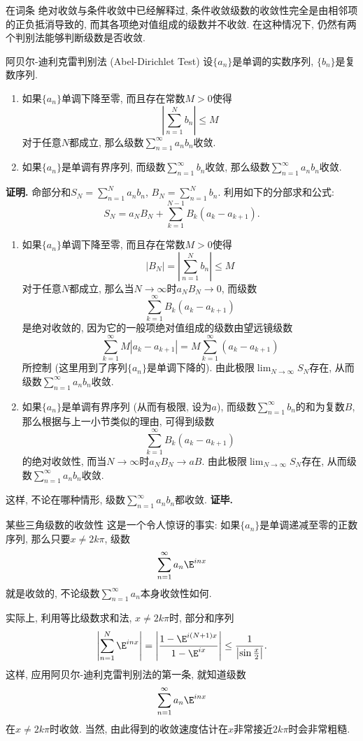 

在词条 绝对收敛与条件收敛中已经解释过, 条件收敛级数的收敛性完全是由相邻项的正负抵消导致的, 而其各项绝对值组成的级数并不收敛. 在这种情况下, 仍然有两个判别法能够判断级数是否收敛.

\begin{theorem}{阿贝尔-迪利克雷判别法 (Abel-Dirichlet Test)}
设$\{a_n\}$是单调的实数序列, $\{b_n\}$是复数序列.

\begin{enumerate}
\item 如果$\{a_n\}$单调下降至零, 而且存在常数$M>0$使得
$$
\left|\sum_{n=1}^N b_n\right|\leq M
$$
对于任意$N$都成立, 那么级数$\sum_{n=1}^\infty a_nb_n$收敛.

\item 如果$\{a_n\}$是单调有界序列, 而级数$\sum_{n=1}^\infty b_n$收敛, 那么级数$\sum_{n=1}^\infty a_nb_n$收敛.
\end{enumerate}
\end{theorem}

\textbf{证明.} 命部分和$S_N=\sum_{n=1}^N a_nb_n$, $B_N=\sum_{n=1}^N b_n$. 利用如下的分部求和公式:
$$
S_N=a_NB_N+\sum_{k=1}^{N-1}B_k(a_{k}-a_{k+1}).
$$

\begin{enumerate}
\item 如果$\{a_n\}$单调下降至零, 而且存在常数$M>0$使得
$$
|B_N|=\left|\sum_{n=1}^N b_n\right|\leq M
$$
对于任意$N$都成立, 那么当$N\to\infty$时$a_NB_N\to0$, 而级数
$$
\sum_{k=1}^{\infty}B_k(a_{k}-a_{k+1})
$$
是绝对收敛的, 因为它的一般项绝对值组成的级数由望远镜级数
$$
\sum_{k=1}^{\infty}M|a_{k}-a_{k+1}|
=M\sum_{k=1}^{\infty}(a_{k}-a_{k+1})
$$
所控制 (这里用到了序列$\{a_n\}$是单调下降的). 由此极限$\lim_{N\to\infty}S_N$存在, 从而级数$\sum_{n=1}^\infty a_nb_n$收敛.

\item 如果$\{a_n\}$是单调有界序列 (从而有极限, 设为$a$), 而级数$\sum_{n=1}^\infty b_n$的和为复数$B$, 那么根据与上一小节类似的理由, 可得到级数
$$
\sum_{k=1}^{\infty}B_k(a_{k}-a_{k+1})
$$
的绝对收敛性, 而当$N\to\infty$时$a_NB_N\to aB$. 由此极限$\lim_{N\to\infty}S_N$存在, 从而级数$\sum_{n=1}^\infty a_nb_n$收敛.
\end{enumerate}
这样, 不论在哪种情形, 级数$\sum_{n=1}^\infty a_nb_n$都收敛. \textbf{证毕.}

\begin{example}{某些三角级数的收敛性}
这是一个令人惊讶的事实: 如果$\{a_n\}$是单调递减至零的正数序列, 那么只要$x\neq 2k\pi$, 级数
$$
\sum_{n=1}^\infty a_n \E^{inx}
$$
就是收敛的, 不论级数$\sum_{n=1}^\infty a_n$本身收敛性如何.

实际上, 利用等比级数求和法, $x\neq 2k\pi$时, 部分和序列
$$
\left|\sum_{n=1}^N\E^{inx}\right|
=\left|\frac{1-\E^{i(N+1)x}}{1-\E^{ix}}\right|
\leq\frac{1}{\left|\sin\frac{x}{2}\right|}.
$$
这样, 应用阿贝尔-迪利克雷判别法的第一条, 就知道级数
$$
\sum_{n=1}^\infty a_n \E^{inx}
$$
在$x\neq 2k\pi$时收敛. 当然, 由此得到的收敛速度估计在$x$非常接近$2k\pi$时会非常粗糙.
\end{example}